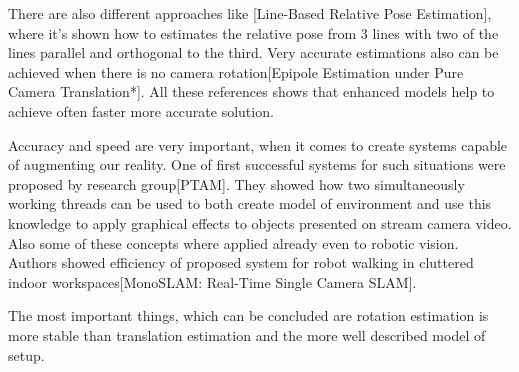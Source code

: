 There are also different approaches like [Line-Based Relative Pose Estimation], where it's shown how to estimates the relative pose from 3  lines with two of the lines parallel and orthogonal to the third. Very accurate estimations also can be achieved when there is no camera rotation[Epipole Estimation under Pure Camera Translation*]. All these references shows that enhanced models help to achieve often faster more accurate solution.

Accuracy and speed are very important, when it comes to create systems capable of augmenting our reality. One of first successful systems for such situations were proposed by research group[PTAM]. They showed how two simultaneously working threads can be used to both create model of environment and use this knowledge to apply graphical effects to objects presented on stream camera video. Also some of these concepts where applied already even to robotic vision. Authors showed efficiency of proposed system for robot walking in cluttered indoor workspaces[MonoSLAM: Real-Time Single Camera SLAM].

The most important things, which can be concluded are rotation estimation is more stable than translation estimation and the more well described model of setup.



